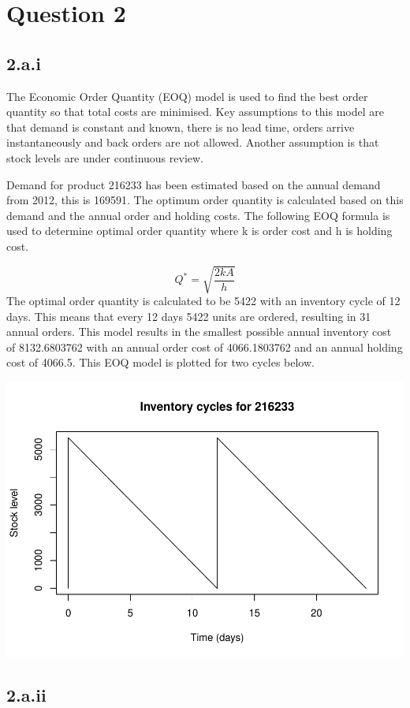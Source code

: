 \documentclass[
  11pt,
]{article}
\begin{document}
\hypertarget{question-2}{%
\section{Question 2}\label{question-2}}

\hypertarget{a.i}{%
\subsection{2.a.i}\label{a.i}}

The Economic Order Quantity (EOQ) model is used to find the best order
quantity so that total costs are minimised. Key assumptions to this
model are that demand is constant and known, there is no lead time,
orders arrive instantaneously and back orders are not allowed. Another
assumption is that stock levels are under continuous review.

Demand for product 216233 has been estimated based on the annual demand
from 2012, this is 169591. The optimum order quantity is calculated
based on this demand and the annual order and holding costs. The
following EOQ formula is used to determine optimal order quantity where
k is order cost and h is holding cost.

\[Q^* =  \sqrt{\frac{2kA}{h}}\] The optimal order quantity is calculated
to be 5422 with an inventory cycle of 12 days. This means that every 12
days 5422 units are ordered, resulting in 31 annual orders. This model
results in the smallest possible annual inventory cost of 8132.6803762
with an annual order cost of 4066.1803762 and an annual holding cost of
4066.5. This EOQ model is plotted for two cycles below.

\includegraphics[width=0.75\linewidth]{Assignment-STAT702---final_files/figure-latex/2ai plot-1}

\hypertarget{a.ii}{%
\subsection{2.a.ii}\label{a.ii}}
\end{document}
